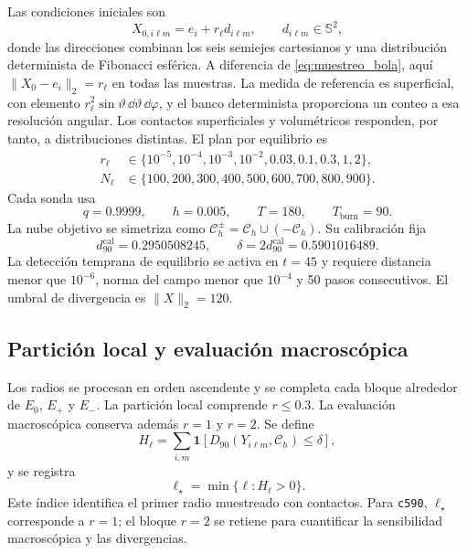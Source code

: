 Las condiciones iniciales son
\begin{equation}
X_{0,i\ell m}=e_i+r_\ell d_{i\ell m},
\qquad d_{i\ell m}\in\mathbb S^2,
\label{eq:muestreo_superficie_c590}
\end{equation}
donde las direcciones combinan los seis semiejes cartesianos y una
distribución determinista de Fibonacci esférica. A diferencia de
\cref{eq:muestreo_bola}, aquí \(\|X_0-e_i\|_2=r_\ell\) en todas las
muestras. La medida de referencia es superficial, con elemento
\(r_\ell^2\sin\vartheta\,\dd\vartheta\,\dd\varphi\), y el banco
determinista proporciona un conteo a esa resolución angular. Los contactos
superficiales y volumétricos responden, por tanto, a distribuciones distintas.
El plan por equilibrio es
\begin{equation}
\begin{aligned}
r_\ell&\in\{10^{-5},10^{-4},10^{-3},10^{-2},0.03,0.1,0.3,1,2\},\\
N_\ell&\in\{100,200,300,400,500,600,700,800,900\}.
\end{aligned}
\label{eq:plan_superficies_c590}
\end{equation}
Cada sonda usa
\[
q=0.9999,\qquad h=0.005,\qquad
T=180,\qquad T_{\mathrm{burn}}=90.
\]
La nube objetivo se simetriza como
\(\mathcal C_h^\pm=\mathcal C_h\cup(-\mathcal C_h)\). Su calibración fija
\begin{equation}
d_{90}^{\mathrm{cal}}=0.2950508245,\qquad
\delta=2d_{90}^{\mathrm{cal}}=0.5901016489.
\label{eq:umbral_c590}
\end{equation}
La detección temprana de equilibrio se activa en \(t=45\) y requiere distancia
menor que \(10^{-6}\), norma del campo menor que \(10^{-4}\) y 50 pasos
consecutivos. El umbral de divergencia es \(\|X\|_2=120\).

\subsection{Partición local y evaluación macroscópica}
\label{subsec:detencion_primer_contacto}

Los radios se procesan en orden ascendente y se completa cada bloque alrededor
de \(E_0\), \(E_+\) y \(E_-\). La partición local comprende \(r\leq0.3\).
La evaluación macroscópica conserva además \(r=1\) y \(r=2\). Se define
\[
H_\ell=\sum_{i,m}
\mathbf 1\!\left[
D_{90}(Y_{i\ell m},\mathcal C_h)\leq\delta
\right],
\]
y se registra
\begin{equation}
\ell_\star=\min\{\ell:H_\ell>0\}.
\label{eq:primer_radio_contacto}
\end{equation}
Este índice identifica el primer radio muestreado con contactos. Para \texttt{c590}, \(\ell_\star\)
corresponde a \(r=1\); el bloque \(r=2\) se retiene para cuantificar la
sensibilidad macroscópica y las divergencias.

